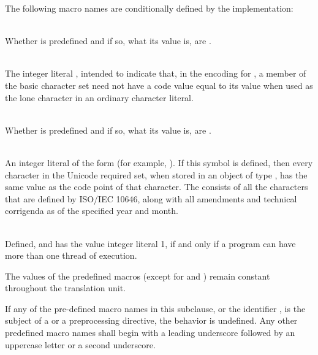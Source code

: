 \pnum
The following macro names are conditionally defined by the implementation:

\begin{description}
\item
{}%
\\
Whether  is predefined and if so, what its value is,
are .

\item
{}%
\\
The integer literal , intended to indicate that, in the encoding for
, a member of the basic character set need not have a code value equal to
its value when used as the lone character in an ordinary character literal.

\item
{}%
\\
Whether  is predefined and if so, what its value is,
are .

\item
{}%
\\
An integer literal of the form  (for example,
).
If this symbol is defined, then every character in the Unicode required set, when
stored in an object of type , has the same value as the code point
of that character. The  consists of all
the characters that are defined by ISO/IEC 10646, along with
all amendments and technical corrigenda as of the specified year and month.

\item
{}%
\\
Defined, and has the value integer literal 1, if and only if a program
can have more than one thread of execution.

\end{description}

\pnum
The values of the predefined macros
(except for
and
)
remain constant throughout the translation unit.

\pnum
If any of the pre-defined macro names in this subclause,
or the identifier
,
is the subject of a
or a
preprocessing directive,
the behavior is undefined.
Any other predefined macro names shall begin with a
leading underscore followed by an uppercase letter or a second
underscore.

